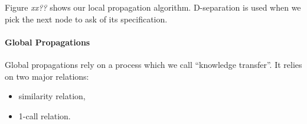 

Figure \emph{xx??} shows our local propagation algorithm. D-separation is used
when we pick the next node to ask of its specification. 





\paragraph{Global Propagations}

Global propagations rely on a process which we call ``knowledge transfer''. It
relies on two major relations:

\begin{itemize}
\item similarity relation,
\item 1-call relation.
\end{itemize}


